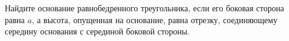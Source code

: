 \begin{ex}
	\begin{condition}
		Найдите основание равнобедренного треугольника,	если его боковая сторона равна \( a \), а высота, опущенная на основание, равна отрезку, соединяющему середину основания с серединой боковой стороны.
	\end{condition}
\end{ex}